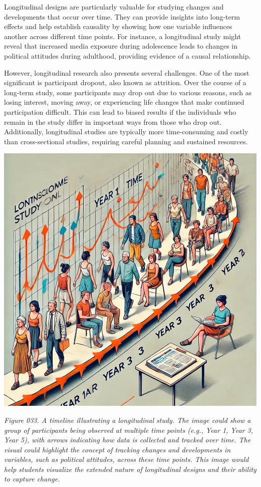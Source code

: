 \documentclass[
]{book}
\begin{document}
Longitudinal designs are particularly valuable for studying changes and developments that occur over time. They can provide insights into long-term effects and help establish causality by showing how one variable influences another across different time points. For instance, a longitudinal study might reveal that increased media exposure during adolescence leads to changes in political attitudes during adulthood, providing evidence of a causal relationship.

However, longitudinal research also presents several challenges. One of the most significant is participant dropout, also known as attrition. Over the course of a long-term study, some participants may drop out due to various reasons, such as losing interest, moving away, or experiencing life changes that make continued participation difficult. This can lead to biased results if the individuals who remain in the study differ in important ways from those who drop out. Additionally, longitudinal studies are typically more time-consuming and costly than cross-sectional studies, requiring careful planning and sustained resources.

\includegraphics[width=1\textwidth,height=\textheight]{images/fig033.jpg}

\emph{Figure 033. A timeline illustrating a longitudinal study. The image could show a group of participants being observed at multiple time points (e.g., Year 1, Year 3, Year 5), with arrows indicating how data is collected and tracked over time. The visual could highlight the concept of tracking changes and developments in variables, such as political attitudes, across these time points. This image would help students visualize the extended nature of longitudinal designs and their ability to capture change.}
\end{document}

